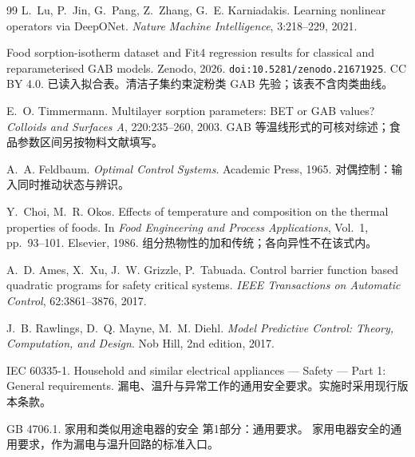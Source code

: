 \begin{thebibliography}{99}
L.~Lu, P.~Jin, G.~Pang, Z.~Zhang, G.~E. Karniadakis.
\newblock Learning nonlinear operators via DeepONet.
\newblock \emph{Nature Machine Intelligence}, 3:218--229, 2021.

Food sorption-isotherm dataset and Fit4 regression results for classical and reparameterised GAB models.
\newblock Zenodo, 2026. \texttt{doi:10.5281/zenodo.21671925}. CC BY 4.0.
\newblock 已读入拟合表。清洁子集约束淀粉类 GAB 先验；该表不含肉类曲线。

E.~O. Timmermann.
\newblock Multilayer sorption parameters: BET or GAB values?
\newblock \emph{Colloids and Surfaces A}, 220:235--260, 2003.
\newblock GAB 等温线形式的可核对综述；食品参数区间另按物料文献填写。

A.~A. Feldbaum.
\newblock \emph{Optimal Control Systems}.
\newblock Academic Press, 1965.
\newblock 对偶控制：输入同时推动状态与辨识。

Y.~Choi, M.~R. Okos.
\newblock Effects of temperature and composition on the thermal properties of foods.
\newblock In \emph{Food Engineering and Process Applications}, Vol.~1, pp.~93--101. Elsevier, 1986.
\newblock 组分热物性的加和传统；各向异性不在该式内。

A.~D. Ames, X.~Xu, J.~W. Grizzle, P.~Tabuada.
\newblock Control barrier function based quadratic programs for safety critical systems.
\newblock \emph{IEEE Transactions on Automatic Control}, 62:3861--3876, 2017.

J.~B. Rawlings, D.~Q. Mayne, M.~M. Diehl.
\newblock \emph{Model Predictive Control: Theory, Computation, and Design}.
\newblock Nob Hill, 2nd edition, 2017.

IEC 60335-1.
\newblock Household and similar electrical appliances --- Safety --- Part 1: General requirements.
\newblock 漏电、温升与异常工作的通用安全要求。实施时采用现行版本条款。

GB 4706.1.
\newblock 家用和类似用途电器的安全 第1部分：通用要求。
\newblock 家用电器安全的通用要求，作为漏电与温升回路的标准入口。
\end{thebibliography}
